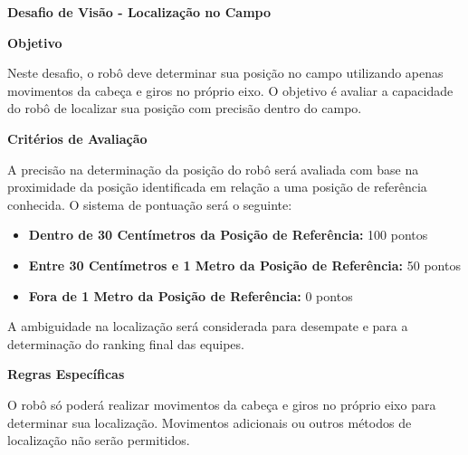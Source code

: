 \clearpage
\sffamily
{\bfseries\color[rgb]{0.4,0.4,0.4}Desafio de Visão - Localização no Campo}
{}

\bigskip

{\bfseries Objetivo}

\headlinebox

Neste desafio, o robô deve determinar sua posição no campo utilizando apenas movimentos da cabeça e giros no próprio eixo. O objetivo é avaliar a capacidade do robô de localizar sua posição com precisão dentro do campo.

\bigskip

{\bfseries Critérios de Avaliação}

\headlinebox

A precisão na determinação da posição do robô será avaliada com base na proximidade da posição identificada em relação a uma posição de referência conhecida. O sistema de pontuação será o seguinte:
\begin{itemize}
	\item \textbf{Dentro de 30 Centímetros da Posição de Referência:} 100 pontos
	\item \textbf{Entre 30 Centímetros e 1 Metro da Posição de Referência:} 50 pontos
	\item \textbf{Fora de 1 Metro da Posição de Referência:} 0 pontos
\end{itemize}

A ambiguidade na localização será considerada para desempate e para a determinação do ranking final das equipes.

\bigskip

{\bfseries Regras Específicas}

\headlinebox

O robô só poderá realizar movimentos da cabeça e giros no próprio eixo para determinar sua localização. Movimentos adicionais ou outros métodos de localização não serão permitidos.